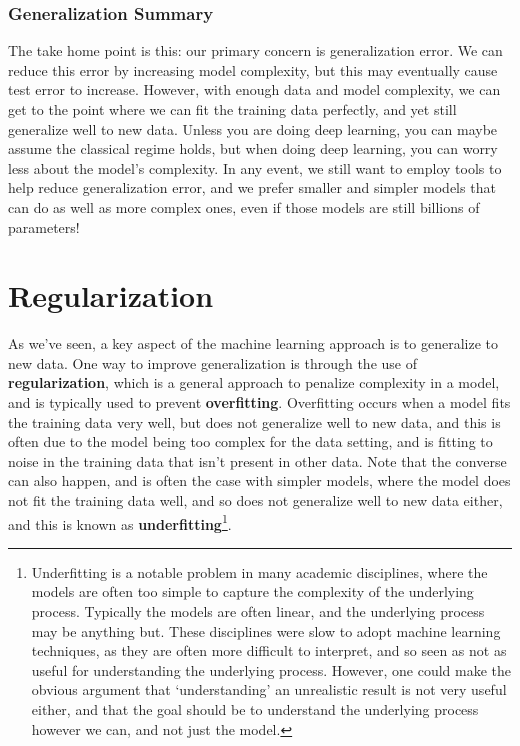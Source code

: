 \documentclass[
  letterpaper,
]{krantz}
\begin{document}
\subsubsection{Generalization Summary}\label{generalization-summary}

The take home point is this: our primary concern is generalization
error. We can reduce this error by increasing model complexity, but this
may eventually cause test error to increase. However, with enough data
and model complexity, we can get to the point where we can fit the
training data perfectly, and yet still generalize well to new data.
Unless you are doing deep learning, you can maybe assume the classical
regime holds, but when doing deep learning, you can worry less about the
model's complexity. In any event, we still want to employ tools to help
reduce generalization error, and we prefer smaller and simpler models
that can do as well as more complex ones, even if those models are still
billions of parameters!

\section{Regularization}\label{regularization}

As we've seen, a key aspect of the machine learning approach is to
generalize to new data. One way to improve generalization is through the
use of \textbf{regularization}, which is a general approach to penalize
complexity in a model, and is typically used to prevent
\textbf{overfitting}. Overfitting occurs when a model fits the training
data very well, but does not generalize well to new data, and this is
often due to the model being too complex for the data setting, and is
fitting to noise in the training data that isn't present in other data.
Note that the converse can also happen, and is often the case with
simpler models, where the model does not fit the training data well, and
so does not generalize well to new data either, and this is known as
\textbf{underfitting}\footnote{Underfitting is a notable problem in many
  academic disciplines, where the models are often too simple to capture
  the complexity of the underlying process. Typically the models are
  often linear, and the underlying process may be anything but. These
  disciplines were slow to adopt machine learning techniques, as they
  are often more difficult to interpret, and so seen as not as useful
  for understanding the underlying process. However, one could make the
  obvious argument that `understanding' an unrealistic result is not
  very useful either, and that the goal should be to understand the
  underlying process however we can, and not just the model.}.
\end{document}
